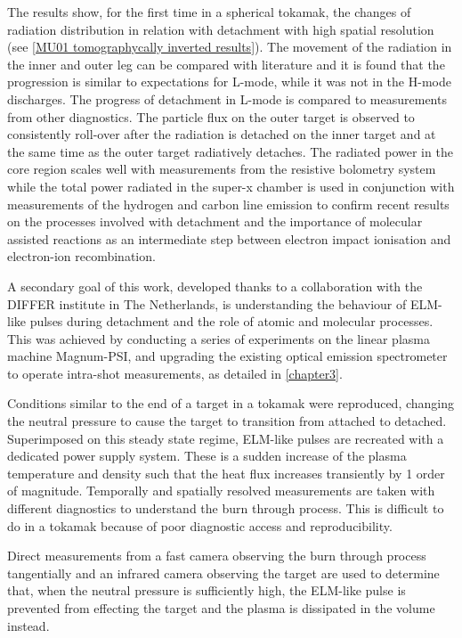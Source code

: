 The results show, for the first time in a spherical tokamak, the changes of radiation distribution in relation with detachment with high spatial resolution (see \autoref{MU01 tomographycally inverted results}). The movement of the radiation in the inner and outer leg can be compared with literature\cite{Reimold2015,Potzel2014,Lipschultz1984,Bernert2021} and it is found that the progression is similar to expectations for L-mode, while it was not in the H-mode discharges. The progress of detachment in L-mode is compared to measurements from other diagnostics. The particle flux on the outer target is observed to consistently roll-over after the radiation is detached on the inner target and at the same time as the outer target radiatively detaches.
The radiated power in the core region scales well with measurements from the resistive bolometry system while the total power radiated in the super-x chamber is used in conjunction with measurements of the hydrogen and carbon line emission to confirm recent results on the processes involved with detachment\cite{Verhaegh2022} and the importance of molecular assisted reactions as an intermediate step between electron impact ionisation and electron-ion recombination.

A secondary goal of this work, developed thanks to a collaboration with the DIFFER institute in The Netherlands, is understanding the behaviour of ELM-like pulses during detachment and the role of atomic and molecular processes. This was achieved by conducting a series of experiments on the linear plasma machine Magnum-PSI, and upgrading the existing optical emission spectrometer to operate intra-shot measurements, as detailed in \autoref{chapter3}.

Conditions similar to the end of a target in a tokamak were reproduced, changing the neutral pressure to cause the target to transition from attached to detached. Superimposed on this steady state regime, ELM-like pulses are recreated with a dedicated power supply system. These is a sudden increase of the plasma temperature and density such that the heat flux increases transiently by 1 order of magnitude. Temporally and spatially resolved measurements are taken with different diagnostics to understand the burn through process. This is difficult to do in a tokamak because of poor diagnostic access and reproducibility.

Direct measurements from a fast camera observing the burn through process tangentially and an infrared camera observing the target are used to determine that, when the neutral pressure is sufficiently high, the ELM-like pulse is prevented from effecting the target and the plasma is dissipated in the volume instead.

